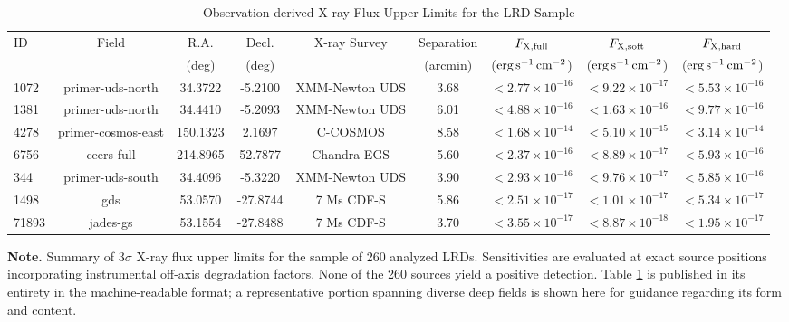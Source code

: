 \documentclass[twocolumn]{aastex631}
\begin{document}
\begin{table}[ht!]
\centering
\setlength{\tabcolsep}{2.0pt}
\caption{Observation-derived X-ray Flux Upper Limits for the LRD Sample} \label{tab:xray_limits}
\begin{tabular}{lcccccccc}
\hline\hline
ID & Field & R.A. & Decl. & X-ray Survey & Separation & $F_{\rm X, full}$ & $F_{\rm X, soft}$ & $F_{\rm X, hard}$ \\
 & & (deg) & (deg) & & (arcmin) & ($\rm erg\,s^{-1}\,cm^{-2}$) & ($\rm erg\,s^{-1}\,cm^{-2}$) & ($\rm erg\,s^{-1}\,cm^{-2}$) \\
\hline
1072 & primer-uds-north & 34.3722 & -5.2100 & XMM-Newton UDS & 3.68 & $<2.77 \times 10^{-16}$ & $<9.22 \times 10^{-17}$ & $<5.53 \times 10^{-16}$ \\
1381 & primer-uds-north & 34.4410 & -5.2093 & XMM-Newton UDS & 6.01 & $<4.88 \times 10^{-16}$ & $<1.63 \times 10^{-16}$ & $<9.77 \times 10^{-16}$ \\
4278 & primer-cosmos-east & 150.1323 & 2.1697 & C-COSMOS & 8.58 & $<1.68 \times 10^{-14}$ & $<5.10 \times 10^{-15}$ & $<3.14 \times 10^{-14}$ \\
6756 & ceers-full & 214.8965 & 52.7877 & Chandra EGS & 5.60 & $<2.37 \times 10^{-16}$ & $<8.89 \times 10^{-17}$ & $<5.93 \times 10^{-16}$ \\
344 & primer-uds-south & 34.4096 & -5.3220 & XMM-Newton UDS & 3.90 & $<2.93 \times 10^{-16}$ & $<9.76 \times 10^{-17}$ & $<5.85 \times 10^{-16}$ \\
1498 & gds & 53.0570 & -27.8744 & 7 Ms CDF-S & 5.86 & $<2.51 \times 10^{-17}$ & $<1.01 \times 10^{-17}$ & $<5.34 \times 10^{-17}$ \\
71893 & jades-gs & 53.1554 & -27.8488 & 7 Ms CDF-S & 3.70 & $<3.55 \times 10^{-17}$ & $<8.87 \times 10^{-18}$ & $<1.95 \times 10^{-17}$ \\
\hline
\end{tabular}
\par\medskip
\begin{minipage}{0.9\textwidth}
\small \textbf{Note.} Summary of $3\sigma$ X-ray flux upper limits for the sample of 260 analyzed LRDs. Sensitivities are evaluated at exact source positions incorporating instrumental off-axis degradation factors. None of the 260 sources yield a positive detection. Table \ref{tab:xray_limits} is published in its entirety in the machine-readable format; a representative portion spanning diverse deep fields is shown here for guidance regarding its form and content.
\end{minipage}
\end{table} 
\end{document}
